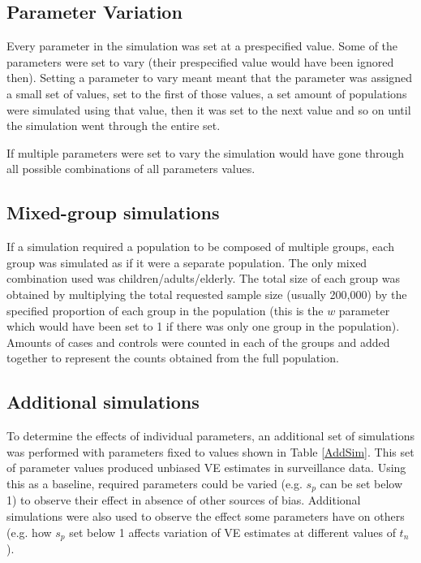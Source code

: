 \documentclass[11pt]{article}
\begin{document}
\pagebreak
\subsection{Parameter Variation}

Every parameter in the simulation was set at a prespecified value. Some of the parameters were set to vary (their prespecified value would have been ignored then). Setting a parameter to vary meant meant that the parameter was assigned a small set of values, set to the first of those values, a set amount of populations were simulated using that value, then it was set to the next value and so on until the simulation went through the entire set.

If multiple parameters were set to vary the simulation would have gone through all possible combinations of all parameters values.

\subsection{Mixed-group simulations}

If a simulation required a population to be composed of multiple groups, each group was simulated as if it were a separate population. The only mixed combination used was children/adults/elderly. The total size of each group was obtained by multiplying the total requested sample size (usually 200,000) by the specified proportion of each group in the population (this is the $w$ parameter which would have been set to 1 if there was only one group in the population). Amounts of cases and controls were counted in each of the groups and added together to represent the counts obtained from the full population.

\subsection{Additional simulations}

To determine the effects of individual parameters, an additional set of simulations was performed with parameters fixed to values shown in Table \ref{AddSim}. This set of parameter values produced unbiased VE estimates in surveillance data. Using this as a baseline, required parameters could be varied (e.g. $s_p$ can be set below 1) to observe their effect in absence of other sources of bias. Additional simulations were also used to observe the effect some parameters have on others (e.g. how $s_p$ set below 1 affects variation of VE estimates at different values of $t_n$).
\end{document}
